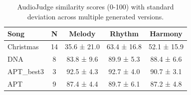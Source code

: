 
\begin{table}[t]
\centering
\small
\caption{AudioJudge similarity scores (0-100) with standard deviation across multiple generated versions.}
\label{tab:audiojudge-stats}
\begin{tabular}{lcccc}
\toprule
\textbf{Song} & \textbf{N} & \textbf{Melody} & \textbf{Rhythm} & \textbf{Harmony} \\
\midrule
Christmas & 14 & 35.6 ± 21.0 & 63.4 ± 16.8 & 52.1 ± 15.9 \\
DNA & 8 & 83.8 ± 9.6 & 89.9 ± 5.3 & 88.4 ± 6.6 \\
APT_best3 & 3 & 92.5 ± 4.3 & 92.7 ± 4.0 & 90.7 ± 3.1 \\
APT & 9 & 87.4 ± 4.4 & 89.7 ± 6.1 & 87.2 ± 4.8 \\
\bottomrule
\end{tabular}
\end{table}
